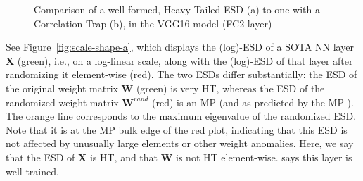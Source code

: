 \begin{figure}[h]
    \centering
    \caption{Comparison of a well-formed, Heavy-Tailed ESD (a) to one with a Correlation Trap (b), in the VGG16 model (FC2 layer)}
  \label{fig:scale-shape}                                                                                                      
\end{figure}

See Figure~\ref{fig:scale-shape-a}, which displays the (log)-ESD of a \Typical SOTA NN layer $\mathbf{X}$ (green), i.e., on a log-linear scale, along with the (log)-ESD of that layer after randomizing it element-wise (red).
The two ESDs differ substantially:
the ESD of the original weight matrix  $\mathbf{W}$ (green) is very HT, whereas 
the ESD of the randomized weight matrix  $\mathbf{W}^{rand}$ (red) is an MP (and as predicted by the MP \RMT).
The orange line corresponds to the maximum eigenvalue of the randomized ESD.
Note that it is at the MP bulk edge of the red plot, indicating that this ESD is not affected by unusually large elements or other weight anomalies.
Here, we say that the ESD of $\mathbf{X}$ is HT, and that $\mathbf{W}$ is not HT element-wise.
\HTSR says this layer is well-trained.

